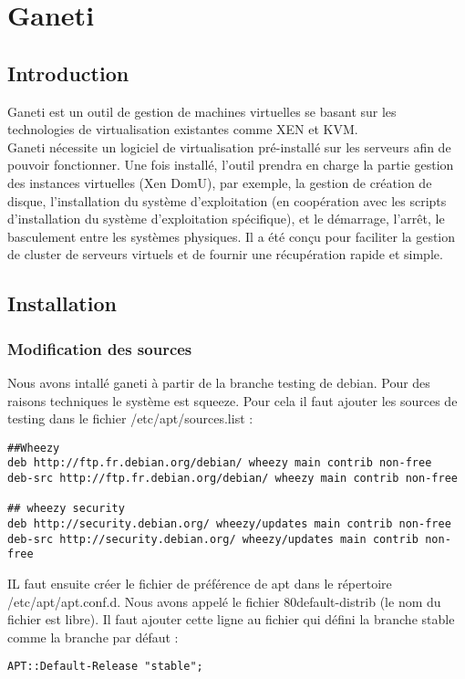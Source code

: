 \chapter{Ganeti}
\section{Introduction}
Ganeti est un outil de gestion de machines virtuelles se basant sur les technologies de virtualisation existantes comme XEN et KVM.\\
Ganeti nécessite un logiciel de virtualisation pré-installé sur les serveurs afin de pouvoir fonctionner. Une fois installé, l'outil prendra en charge la partie gestion des instances virtuelles (Xen DomU), par exemple, la gestion de création de disque, l'installation du système d'exploitation (en coopération avec les scripts d'installation du système d'exploitation spécifique), et le démarrage, l'arrêt, le basculement entre les systèmes physiques. Il a été conçu pour faciliter la gestion de cluster de serveurs virtuels et de fournir une récupération rapide et simple.

\section{Installation}
\subsection{Modification des sources}
Nous avons intallé ganeti à partir de la branche testing de debian. Pour des raisons techniques le système est squeeze. Pour cela il faut ajouter les sources de testing dans le fichier /etc/apt/sources.list :
\begin{lstlisting}
##Wheezy
deb http://ftp.fr.debian.org/debian/ wheezy main contrib non-free
deb-src http://ftp.fr.debian.org/debian/ wheezy main contrib non-free

## wheezy security
deb http://security.debian.org/ wheezy/updates main contrib non-free
deb-src http://security.debian.org/ wheezy/updates main contrib non-free
\end{lstlisting}

IL faut ensuite créer le fichier de préférence de apt dans le répertoire /etc/apt/apt.conf.d. Nous avons appelé le  fichier 80default-distrib (le nom du fichier est libre). Il faut ajouter cette ligne au fichier qui défini la branche stable comme la branche par défaut :
\begin{lstlisting}
APT::Default-Release "stable";
\end{lstlisting}

